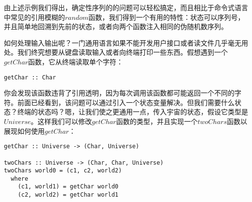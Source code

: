 由上述示例我们得出，确定性序列的的问题可以轻松搞定，而且相比于命令式语言中常见的引用模糊的$random$函数，我们得到一个有用的特性：状态可以序列号，并且简单地回溯到先前的状态，或者向两个函数注入相同的伪随机数序列。

如何处理输入输出呢？一门通用语言如果不能开发用户接口或者读文件几乎毫无用处。我们终究想要从键盘读取输入或者向终端打印一些东西。假想遇到一个$getChar$函数，它从终端读取单个字符：

\begin{lstlisting}
getChar :: Char
\end{lstlisting}

你会发现该函数违背了引用透明，因为每次调用该函数都可能返回一个不同的字符。前面已经看到，该问题可以通过引入一个状态变量解决。但我们需要什么状态？终端的状态吗？嗯，让我们使之更通用一点，传入宇宙的状态，假设它类型是$Universe$。这样我们可以修改$getChar$函数的类型，并且实现一个$twoChars$函数以展现如何使用$getChar$：

\begin{lstlisting}
getChar :: Universe -> (Char, Universe)

twoChars :: Universe -> (Char, Char, Universe)
twoChars world0 = (c1, c2, world2)
  where
    (c1, world1) = getChar world0
    (c2, world2) = getChar world1
\end{lstlisting}
